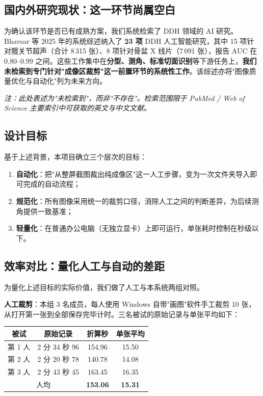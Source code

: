 \documentclass[UTF8,a4paper,10pt]{ctexart}
\begin{document}
\subsection{国内外研究现状：这一环节尚属空白}

为确认该环节是否已有成熟方案，我们系统检索了 DDH 领域的 AI 研究。Bhavsar 等 2025 年的系统综述纳入了 \textbf{23 项} DDH 人工智能研究\cite{bhavsar2025ddh}，其中 15 项针对髋关节超声（合计 8\,315 张）、8 项针对骨盆 X 线片（7\,091 张），报告 AUC 在 0.80--0.99 之间。这些工作集中在\textbf{分型、测角、标准切面识别}等下游任务上，\textbf{我们未检索到专门针对"成像区裁剪"这一前置环节的系统性工作}。该综述亦将"图像质量优化与自动化"列为未来方向。

{\small\itshape 注：此处表述为"未检索到"，而非"不存在"。检索范围限于 PubMed / Web of Science 主要索引中可获取的英文与中文文献。}

\subsection{设计目标}

基于上述背景，本项目确立三个层次的目标：

\begin{enumerate}[leftmargin=1.6em,itemsep=1.5pt,topsep=2pt]
\item \textbf{自动化}：把"从整屏截图裁出纯成像区"这一人工步骤，变为一次文件夹导入即可完成的自动流程；
\item \textbf{规范化}：所有图像采用统一的裁剪口径，消除人工之间的判断差异，为后续测角提供一致基准；
\item \textbf{轻量化}：在普通办公电脑（无独立显卡）上即可运行，单张耗时控制在秒级以下。
\end{enumerate}

\subsection{效率对比：量化人工与自动的差距}

为量化上述目标的实际价值，我们做了人工与本系统两组对照。

\noindent\textbf{人工裁剪}：本组 3 名成员，每人使用 Windows 自带"画图"软件手工裁剪 10 张，从打开第一张到全部保存完毕计时。三名被试的原始记录与单张平均如下：

\begin{center}\small
\begin{tabular}{cccc}
\toprule
被试 & 原始记录 & 折算秒 & 单张平均 \\
\midrule
第 1 人 & 2 分 34 秒 96 & 154.96 & 15.50 \\
第 2 人 & 2 分 20 秒 78 & 140.78 & 14.08 \\
第 3 人 & 2 分 43 秒 45 & 163.45 & 16.35 \\
\midrule
\multicolumn{2}{c}{人均} & \textbf{153.06} & \textbf{15.31} \\
\bottomrule
\end{tabular}
\end{center}
\end{document}
